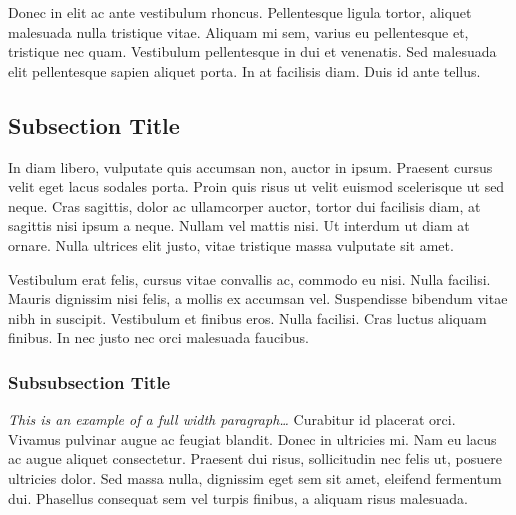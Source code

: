 Donec in elit ac ante vestibulum rhoncus. Pellentesque ligula tortor, aliquet malesuada nulla tristique vitae. Aliquam mi sem, varius eu pellentesque et, tristique nec quam. Vestibulum pellentesque in dui et venenatis. Sed malesuada elit pellentesque sapien aliquet porta. In at facilisis diam. Duis id ante tellus. %

\subsection{Subsection Title} %

In diam libero, vulputate quis accumsan non, auctor in ipsum. Praesent cursus velit eget lacus sodales porta. Proin quis risus ut velit euismod scelerisque ut sed neque. Cras sagittis, dolor ac ullamcorper auctor, tortor dui facilisis diam, at sagittis nisi ipsum a neque. Nullam vel mattis nisi. Ut interdum ut diam at ornare. Nulla ultrices elit justo, vitae tristique massa vulputate sit amet.

Vestibulum erat felis, cursus vitae convallis ac, commodo eu nisi. Nulla facilisi. Mauris dignissim nisi felis, a mollis ex accumsan vel. Suspendisse bibendum vitae nibh in suscipit. Vestibulum et finibus eros. Nulla facilisi. Cras luctus aliquam finibus. In nec justo nec orci malesuada faucibus.

\subsubsection{Subsubsection Title} %

\begin{fullwidth} %
  \textit{This is an example of a full width paragraph\ldots} Curabitur id placerat orci. Vivamus pulvinar augue ac feugiat blandit. Donec in ultricies mi. Nam eu lacus ac augue aliquet consectetur. Praesent dui risus, sollicitudin nec felis ut, posuere ultricies dolor. Sed massa nulla, dignissim eget sem sit amet, eleifend fermentum dui. Phasellus consequat sem vel turpis finibus, a aliquam risus malesuada.
\end{fullwidth}

